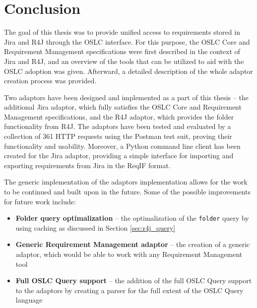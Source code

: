 \chapter{Conclusion}
\label{chapter:conclusion}
The goal of this thesis was to provide unified access to requirements stored in Jira and R4J through the OSLC interface. For this purpose, the OSLC Core and Requirement Management specifications were first described in the context of Jira and R4J, and an overview of the tools that can be utilized to aid with the OSLC adoption was given. Afterward, a detailed description of the whole adaptor creation process was provided.

Two adaptors have been designed and implemented as a part of this thesis -- the additional Jira adaptor, which fully satisfies the OSLC Core and Requirement Management specifications, and the R4J adaptor, which provides the folder functionality from R4J. The adaptors have been tested and evaluated by a collection of 361 HTTP requests using the Postman test suit, proving their functionality and usability. Moreover, a Python command line client has been created for the Jira adaptor, providing a simple interface for importing and exporting requirements from Jira in the ReqIF format.

The generic implementation of the adaptors implementation allows for the work to be continued and built upon in the future. Some of the possible improvements for future work include:

\begin{itemize}
  \item \textbf{Folder query optimalization} -- the optimalization of the \texttt{folder} query by using caching as discussed in Section \ref{sec:r4j_query}
  \item \textbf{Generic Requirement Management adaptor} -- the creation of a generic adaptor, which would be able to work with any Requirement Management tool
  \item \textbf{Full OSLC Query support} -- the addition of the full OSLC Query support to the adaptors by creating a parser for the full extent of the OSLC Query language
\end{itemize}


% 